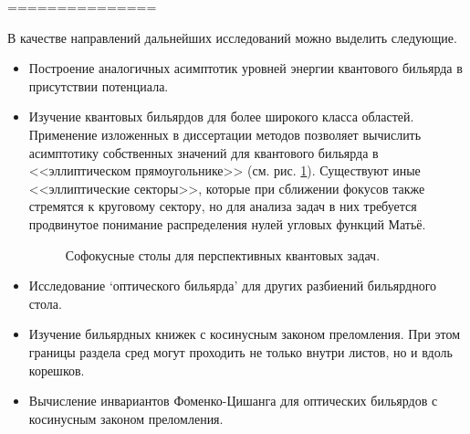 ===============

%
%
%

В качестве направлений дальнейших исследований можно выделить следующие.
  \begin{itemize}[beginpenalty=10000] %
  \item Построение аналогичных асимптотик уровней энергии квантового бильярда в присутствии потенциала.
  \item Изучение квантовых бильярдов для более широкого класса областей. Применение изложенных в диссертации методов позволяет вычислить асимптотику собственных значений для квантового бильярда в <<эллиптическом прямоугольнике>> (см. рис. \ref{fig:conclusion_quantum_domains}). Существуют иные <<эллиптические секторы>>, которые при сближении фокусов также стремятся к круговому сектору, но для анализа задач в них требуется продвинутое понимание распределения нулей  угловых функций Матьё.
    \begin{figure}[ht]
    \caption{Софокусные столы для перспективных квантовых задач.}\label{fig:conclusion_quantum_domains}
\end{figure}  
  \item Исследование `оптического бильярда' для других разбиений бильярдного стола.
  \item Изучение бильярдных книжек с косинусным законом преломления. При этом границы раздела сред могут проходить не только внутри листов, но и вдоль корешков. 
  \item Вычисление инвариантов Фоменко-Цишанга для оптических бильярдов с косинусным законом преломления.
  \end{itemize}

%
